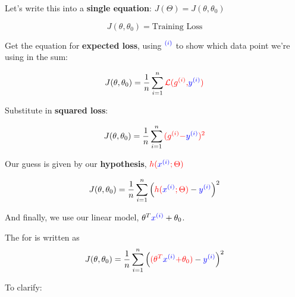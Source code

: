         Let's write this into a \textbf{single equation}: $J(\Theta)=J(\theta,\theta_0)$
        
        \begin{equation}
            J(\theta,\theta_0) = \text{Training Loss}
        \end{equation}
        
        Get the equation for \textbf{expected loss}, using $\textcolor{blue}{^{(i)}}$ to show which data point we're using in the sum:
        
        \begin{equation}
            J(\theta,\theta_0) = 
            \frac{1}{n}  \sum_{i=1}^n 
            \textcolor{red}{ \mathcal{L} ( g^{(i)}, } \textcolor{blue}{y^{(i)}}  \textcolor{red}{)}
        \end{equation}
        
        Substitute in \textbf{squared loss}:
        
        \begin{equation}
            J(\theta,\theta_0) = 
            \frac{1}{n}  \sum_{i=1}^n 
            \textcolor{red}{ ( g^{(i)} -} \textcolor{blue}{ y^{(i)}} \textcolor{red}{)^2 }
        \end{equation}
        
        Our guess is given by our \textbf{hypothesis}, $\textcolor{red}{h(} \textcolor{blue}{x^{(i)}} \textcolor{red}{;\Theta)}$
        
        \begin{equation}
            J(\theta,\theta_0) = 
            \frac{1}{n}  \sum_{i=1}^n 
            \left( 
                \textcolor{red}{h(} \textcolor{blue}{x^{(i)}} \textcolor{red}{;\Theta)} - \textcolor{blue}{ y^{(i)}} 
            \right)^2 
        \end{equation}
        
        And finally, we use our linear model, $\theta^T \textcolor{blue}{x^{(i)}}  + \theta_0$.\\
        
        \begin{kequation}
            The   for  is written as 
            \begin{equation*}
                J(\theta,\theta_0) = 
                \frac{1}{n}  \sum_{i=1}^n 
                \left( \textcolor{red}{ (\theta^T} \textcolor{blue}{x^{(i)}} \textcolor{red}{ + \theta_0) } 
                - \textcolor{blue}{y^{(i)}} \right)^2 
            \end{equation*}
        \end{kequation}
        
        To clarify:
        

